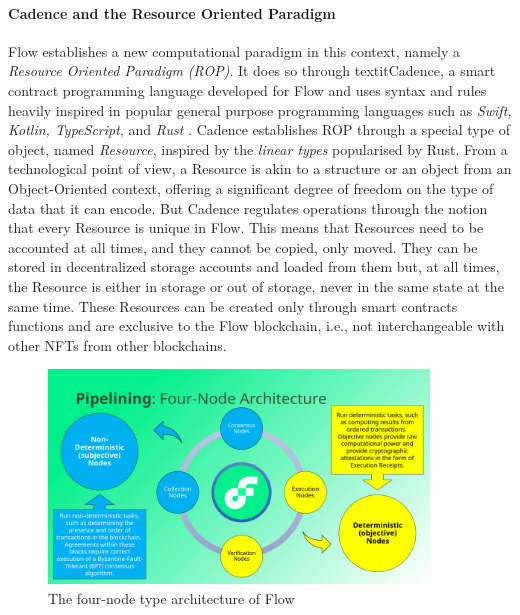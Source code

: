 \documentclass[../main.tex]{subfiles}
\begin{document}
\paragraph{Cadence and the Resource Oriented Paradigm}
\label{sec:cadence_resource_oriented_paradigm}
Flow establishes a new computational paradigm in this context, namely a \textit{Resource Oriented Paradigm (ROP)}. It does so through textit{Cadence}, a smart contract programming language developed for Flow and uses syntax and rules heavily inspired in popular general purpose programming languages such as \textit{Swift, Kotlin, TypeScript}, and \textit{Rust} \cite{Cadence2023}. Cadence establishes ROP through a special type of object, named \textit{Resource}, inspired by the \textit{linear types} popularised by Rust. From a technological point of view, a Resource is akin to a structure or an object from an Object-Oriented context, offering a significant degree of freedom on the type of data that it can encode. But Cadence regulates operations through the notion that every Resource is unique in Flow. This means that Resources need to be accounted at all times, and they cannot be copied, only moved. They can be stored in decentralized storage accounts and loaded from them but, at all times, the Resource is either in storage or out of storage, never in the same state at the same time. These Resources can be created only through smart contracts functions and are exclusive to the Flow blockchain, i.e., not interchangeable with other NFTs from other blockchains.

\par

\begin{figure}[htp]
    \centering
    \includegraphics[width=0.9\textwidth]{../Images/03_Flow_architecture.png}
    \caption{The four-node type architecture of Flow \cite{Hentschel2019c}}
    \label{fig:flow_architecture}
\end{figure}
\end{document}
